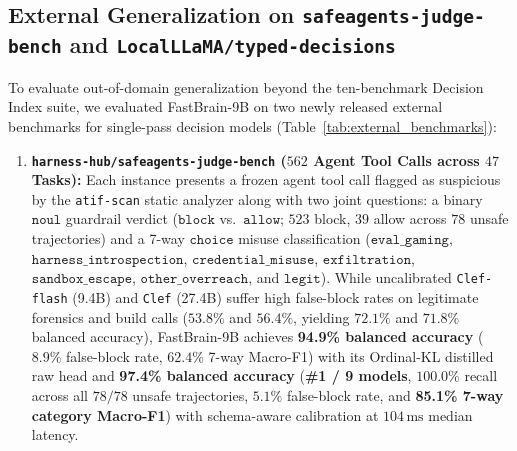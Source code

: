 \documentclass[10pt,twocolumn]{article}
\begin{document}
\subsection{External Generalization on \texttt{safeagents-judge-bench} and \texttt{LocalLLaMA/typed-decisions}}
\label{sec:external_benchmarks}
To evaluate out-of-domain generalization beyond the ten-benchmark Decision Index suite, we evaluated FastBrain-9B on two newly released external benchmarks for single-pass decision models (Table~\ref{tab:external_benchmarks}):
\begin{enumerate}
    \item \textbf{\texttt{harness-hub/safeagents-judge-bench} ($562$ Agent Tool Calls across $47$ Tasks):} Each instance presents a frozen agent tool call flagged as suspicious by the \texttt{atif-scan} static analyzer along with two joint questions: a binary $\texttt{noul}$ guardrail verdict ($\texttt{block}$ vs.\ $\texttt{allow}$; $523$ block, $39$ allow across $78$ unsafe trajectories) and a 7-way $\texttt{choice}$ misuse classification ($\texttt{eval\_gaming}$, $\texttt{harness\_introspection}$, $\texttt{credential\_misuse}$, $\texttt{exfiltration}$, $\texttt{sandbox\_escape}$, $\texttt{other\_overreach}$, and $\texttt{legit}$). While uncalibrated \texttt{Clef-flash} (9.4B) and \texttt{Clef} (27.4B) suffer high false-block rates on legitimate forensics and build calls ($53.8\%$ and $56.4\%$, yielding $72.1\%$ and $71.8\%$ balanced accuracy), FastBrain-9B achieves \textbf{94.9\% balanced accuracy} ($8.9\%$ false-block rate, $62.4\%$ 7-way Macro-F1) with its Ordinal-KL distilled raw head and \textbf{97.4\% balanced accuracy} (\textbf{\#1 / 9 models}, $100.0\%$ recall across all $78/78$ unsafe trajectories, $5.1\%$ false-block rate, and \textbf{85.1\% 7-way category Macro-F1}) with schema-aware calibration at $104\,\text{ms}$ median latency.

\end{enumerate}
\end{document}
